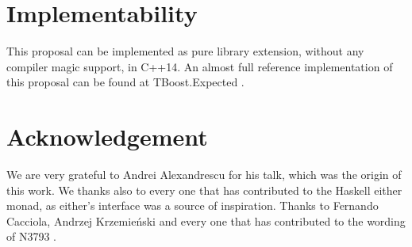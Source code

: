 \documentclass[a4paper,10pt]{article}
\begin{document}
\section{Implementability}
This proposal can be implemented as pure library extension, without any compiler magic support, in C++14. An almost full reference implementation of this proposal can be found at TBoost.Expected \cite{boost.expected}. 
\section{Acknowledgement}

We are very grateful to Andrei Alexandrescu for his talk, which was the origin of this work.
We thanks also to every one that has contributed to the Haskell either monad, as either's interface was a source of inspiration.
Thanks to Fernando Cacciola, Andrzej Krzemieński and every one that has contributed to the wording of N3793 \cite{OptionalRev5}.

\newpage


\end{document}
